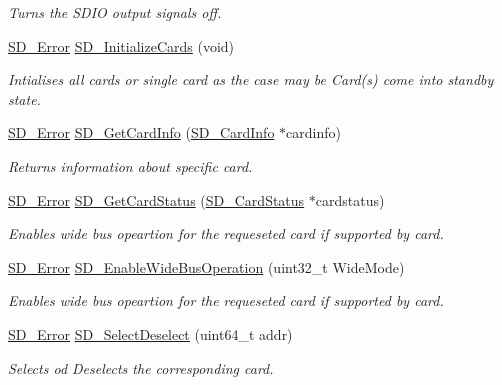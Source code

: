 \begin{DoxyCompactItemize}
\begin{DoxyCompactList}\small\item\em Turns the S\+D\+IO output signals off. \end{DoxyCompactList}\item 
\hyperlink{group__sd__card_gacff91fa68daa1d1ee967b5b3fb3dbd8c}{S\+D\+\_\+\+Error} \hyperlink{group__sd__card__private_gab39f671413ee824a13bf1bd833f724e9}{S\+D\+\_\+\+Initialize\+Cards} (void)
\begin{DoxyCompactList}\small\item\em Intialises all cards or single card as the case may be Card(s) come into standby state. \end{DoxyCompactList}\item 
\hyperlink{group__sd__card_gacff91fa68daa1d1ee967b5b3fb3dbd8c}{S\+D\+\_\+\+Error} \hyperlink{group__sd__card__private_ga5348c3c8f17f8c704bf00f1c5e21549d}{S\+D\+\_\+\+Get\+Card\+Info} (\hyperlink{struct_s_d___card_info}{S\+D\+\_\+\+Card\+Info} $\ast$cardinfo)
\begin{DoxyCompactList}\small\item\em Returns information about specific card. \end{DoxyCompactList}\item 
\hyperlink{group__sd__card_gacff91fa68daa1d1ee967b5b3fb3dbd8c}{S\+D\+\_\+\+Error} \hyperlink{group__sd__card__private_ga858e0742dd01b2e2f6f397d30de6428f}{S\+D\+\_\+\+Get\+Card\+Status} (\hyperlink{struct_s_d___card_status}{S\+D\+\_\+\+Card\+Status} $\ast$cardstatus)
\begin{DoxyCompactList}\small\item\em Enables wide bus opeartion for the requeseted card if supported by card. \end{DoxyCompactList}\item 
\hyperlink{group__sd__card_gacff91fa68daa1d1ee967b5b3fb3dbd8c}{S\+D\+\_\+\+Error} \hyperlink{group__sd__card__private_ga6569e73a229e639d2043549942d58d11}{S\+D\+\_\+\+Enable\+Wide\+Bus\+Operation} (uint32\+\_\+t Wide\+Mode)
\begin{DoxyCompactList}\small\item\em Enables wide bus opeartion for the requeseted card if supported by card. \end{DoxyCompactList}\item 
\hyperlink{group__sd__card_gacff91fa68daa1d1ee967b5b3fb3dbd8c}{S\+D\+\_\+\+Error} \hyperlink{group__sd__card__private_ga849eb0b385337453139a7567898dacb7}{S\+D\+\_\+\+Select\+Deselect} (uint64\+\_\+t addr)
\begin{DoxyCompactList}\small\item\em Selects od Deselects the corresponding card. \end{DoxyCompactList}\item 

\end{DoxyCompactItemize}
